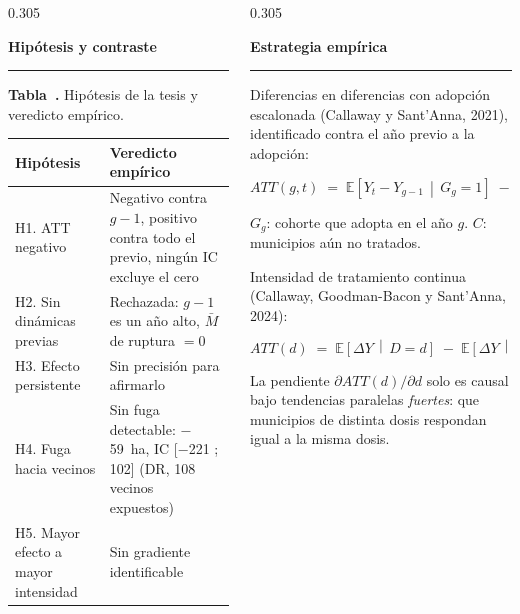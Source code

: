 \documentclass[final,t]{beamer}
\newcommand{\seccion}[2]{%
  \par\vspace{0.5\baselineskip}%
  {\color{dosel}\Large\bfseries #1\hfill{\color{tenue}\normalsize\mdseries #2}}\par
  \vspace{-0.35\baselineskip}%
  {\color{dosel}\rule{\linewidth}{2.2pt}}\par
  \vspace{0.25\baselineskip}%
}
\newcommand{\nota}[1]{{\color{tenue}\small #1\par}}
\newcounter{tabposter}
\newcommand{\tabcap}[2]{\refstepcounter{tabposter}\label{#1}%
  \nota{\textbf{Tabla~\thetabposter.} #2}}
\begin{document}
\begin{frame}[t]{}
\begin{columns}[t]
\begin{column}{0.305\paperwidth}
\seccion{Hipótesis y contraste}{}
\tabcap{tab:hipotesis}{Hipótesis de la tesis y veredicto empírico.}
\begin{center}
\begin{tabularx}{\linewidth}{lX}
\toprule
\rowcolor{dosel}
\textcolor{papel}{\textbf{Hipótesis}} & \textcolor{papel}{\textbf{Veredicto empírico}}\\
\midrule
H1. ATT negativo           & Negativo contra $g-1$, positivo contra todo el previo, ningún IC excluye el cero\\
H2. Sin dinámicas previas  & Rechazada: $g-1$ es un año alto, $\bar{M}$ de ruptura $=0$\\
H3. Efecto persistente     & Sin precisión para afirmarlo\\
H4. Fuga hacia vecinos     & Sin fuga detectable: $-$59~ha, IC [$-$221 ; 102] (DR, 108 vecinos expuestos)\\
H5. Mayor efecto a mayor intensidad & Sin gradiente identificable\\
\bottomrule
\end{tabularx}
\end{center}

\end{column}

\begin{column}{0.305\paperwidth}
\justifying

\seccion{Estrategia empírica}{}
\nota{Diferencias en diferencias con adopción escalonada (Callaway y Sant'Anna, 2021),
identificado contra el año previo a la adopción:}
\begin{tcolorbox}[colback=cajafondo,colframe=regla,boxrule=0.8pt,sharp corners]
\centering
\[
  ATT(g,t) \;=\; \mathbb{E}\!\left[Y_{t}-Y_{g-1}\,\middle|\,G_{g}=1\right]
               \;-\; \mathbb{E}\!\left[Y_{t}-Y_{g-1}\,\middle|\,C=1\right]
\]
\raggedright\nota{$G_g$: cohorte que adopta en el año $g$. $C$: municipios aún no tratados.}
\end{tcolorbox}

\nota{Intensidad de tratamiento continua (Callaway, Goodman-Bacon y Sant'Anna, 2024):}
\begin{tcolorbox}[colback=cajafondo,colframe=regla,boxrule=0.8pt,sharp corners]
\centering
\[
  ATT(d) \;=\; \mathbb{E}\!\left[\Delta Y \,\middle|\, D=d\right]
         \;-\; \mathbb{E}\!\left[\Delta Y \,\middle|\, D=0\right]
\]
\raggedright\nota{La pendiente $\partial ATT(d)/\partial d$ solo es causal bajo tendencias
paralelas \emph{fuertes}: que municipios de distinta dosis respondan igual a la misma dosis.}
\end{tcolorbox}


\end{column}
\end{columns}
\end{frame}
\end{document}
